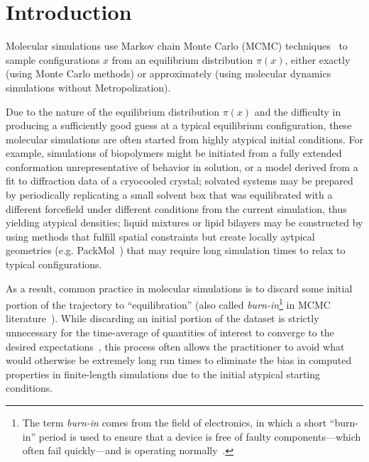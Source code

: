 \documentclass[aps,pre,twocolumn,nofootinbib,superscriptaddress,linenumbers,11point]{revtex4-1}
\begin{document}

\section*{Introduction}
\label{section:introduction}

Molecular simulations use Markov chain Monte Carlo (MCMC) techniques~\cite{jun-s-liu:mcmc} to sample configurations $x$ from an equilibrium distribution $\pi(x)$, either exactly (using Monte Carlo methods) or approximately (using molecular dynamics simulations without Metropolization).

Due to the nature of the equilibrium distribution $\pi(x)$ and the difficulty in producing a sufficiently good guess at a typical equilibrium configuration, these molecular simulations are often started from highly atypical initial conditions.
For example, simulations of biopolymers might be initiated from a fully extended conformation unrepresentative of behavior in solution, or a model derived from a fit to diffraction data of a cryocooled crystal; 
solvated systems may be prepared by periodically replicating a small solvent box that was equilibrated with a different forcefield under different conditions from the current simulation, thus yielding atypical densities; 
liquid mixtures or lipid bilayers may be constructed by using methods that fulfill spatial constraints but create locally aytpical geometries (e.g. PackMol~\cite{martinez:jctc:2009:packmol}) that may require long simulation times to relax to typical configurations.

As a result, common practice in molecular simulations is to discard some initial portion of the trajectory to ``equilibration'' (also called \emph{burn-in}\footnote{The term \emph{burn-in} comes from the field of electronics, in which a short ``burn-in'' period is used to ensure that a device is free of faulty components---which often fail quickly---and is operating normally~\cite{crc-mcmc-handbook}.} in MCMC literature~\cite{crc-mcmc-handbook}).
While discarding an initial portion of the dataset is strictly unnecessary for the time-average of quantities of interest to converge to the desired expectations~\cite{geyer:burn-in-unnecessary,crc-mcmc-handbook}, this process often allows the practitioner to avoid what would otherwise be extremely long run times to eliminate the bias in computed properties in finite-length simulations due to the initial atypical starting conditions.
\end{document}
